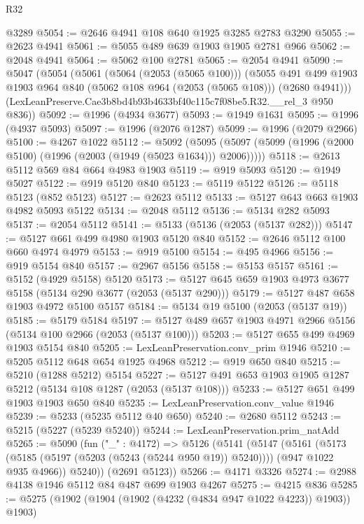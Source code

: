 \begin{lexlean}{R32}
\begin{coremodule}
    @3289
@5054 := @2646 @4941 @108 @640 @1925 @3285 @2783 @3290
@5055 := @2623 @4941
@5061 := @5055 @489 @639 @1903 @1905 @2781 @966
@5062 := @2048 @4941
@5064 := @5062 @100 @2781
@5065 := @2054 @4941
@5090 := @5047
    (@5054
      (@5061
        (@5064 (@2053 (@5065 @100)))
        (@5055
          @491
          @499
          @1903
          @1903
          @964
          @840
          (@5062 @108 @964 (@2053 (@5065 @108)))
          (@2680 @4941)))
      (LexLeanPreserve.Cae3b8bd4b93b4633bf40c115c7f08be5.R32.__rel_3 @950 @836))
@5092 := @1996 (@4934 @3677)
@5093 := @1949 @1631
@5095 := @1996 (@4937 @5093)
@5097 := @1996 (@2076 @1287)
@5099 := @1996 (@2079 @2966)
@5100 := @4267 @1022
@5112 := @5092
    (@5095 (@5097 (@5099 (@1996 (@2000 @5100) (@1996 (@2003 (@1949 (@5023 @1634))) @2006)))))
@5118 := @2613 @5112 @569 @84 @664 @4983 @1903
@5119 := @919 @5093
@5120 := @1949 @5027
@5122 := @919 @5120 @840
@5123 := @5119 @5122
@5126 := @5118 @5123 (@852 @5123)
@5127 := @2623 @5112
@5133 := @5127 @643 @663 @1903 @4982 @5093 @5122
@5134 := @2048 @5112
@5136 := @5134 @282 @5093
@5137 := @2054 @5112
@5141 := @5133 (@5136 (@2053 (@5137 @282)))
@5147 := @5127 @661 @499 @4980 @1903 @5120 @840
@5152 := @2646 @5112 @100 @660 @4974 @4979
@5153 := @919 @5100
@5154 := @495 @4966
@5156 := @919 @5154 @840
@5157 := @2967 @5156
@5158 := @5153 @5157
@5161 := @5152 (@4929 @5158) @5120
@5173 := @5127 @645 @659 @1903 @4973 @3677 @5158 (@5134 @290 @3677 (@2053 (@5137 @290)))
@5179 := @5127 @487 @658 @1903 @4972 @5100 @5157
@5184 := @5134 @19 @5100 (@2053 (@5137 @19))
@5185 := @5179 @5184
@5197 := @5127 @489 @657 @1903 @4971 @2966 @5156 (@5134 @100 @2966 (@2053 (@5137 @100)))
@5203 := @5127 @655 @499 @4969 @1903 @5154 @840
@5205 := LexLeanPreservation.conv_prim @1946
@5210 := @5205 @5112 @648 @654 @1925 @4968
@5212 := @919 @650 @840
@5215 := @5210 (@1288 @5212) @5154
@5227 := @5127 @491 @653 @1903 @1905 @1287 @5212 (@5134 @108 @1287 (@2053 (@5137 @108)))
@5233 := @5127 @651 @499 @1903 @1903 @650 @840
@5235 := LexLeanPreservation.conv_value @1946
@5239 := @5233 (@5235 @5112 @40 @650)
@5240 := @2680 @5112
@5243 := @5215 (@5227 (@5239 @5240))
@5244 := LexLeanPreservation.prim_natAdd
@5265 := @5090
    (fun ("_" : @4172) =>
    @5126
      (@5141
        (@5147
          (@5161
            (@5173 (@5185 (@5197 (@5203 (@5243 (@5244 @950 @19)) @5240))))
            (@947 @1022 @935 @4966))
          @5240))
      (@2691 @5123))
@5266 := @4171 @3326
@5274 := @2988 @4138 @1946 @5112 @84 @487 @699 @1903 @4267
@5275 := @4215 @836
@5285 := @5275 (@1902 (@1904 (@1902 (@4232 (@4834 @947 @1022 @4223)) @1903)) @1903)

\end{coremodule}
\end{lexlean}
